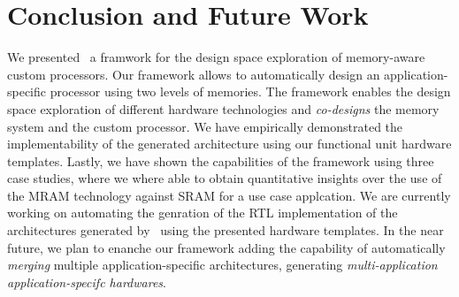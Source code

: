 \section{Conclusion and Future Work}
We presented \frameworkname~a framwork for the design space exploration of  memory-aware custom processors. Our framework allows to automatically design an application-specific processor using two levels of memories. The framework enables the design space exploration of different hardware technologies and \textit{co-designs} the memory system and the custom processor. We have empirically demonstrated the implementability of the generated architecture using our functional unit hardware templates. Lastly, we have shown the capabilities of the framework using three case studies, where we where able to obtain quantitative insights over the use of the MRAM technology against SRAM for a use case applcation. 
We are currently working on automating the genration of the RTL implementation of the architectures generated by \frameworkname~using the presented hardware templates. In the near future, we plan to enanche our framework adding the capability of automatically \textit{merging} multiple application-specific architectures, generating \textit{multi-application application-specifc hardwares}.
